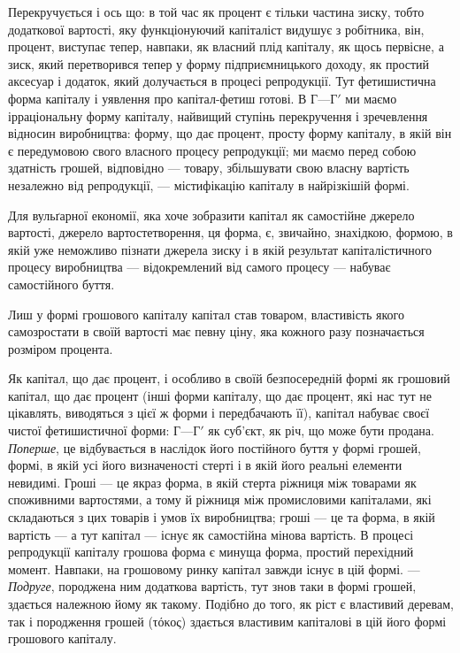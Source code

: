 Перекручується і ось що: в той час як процент є тільки
частина зиску, тобто додаткової вартості, яку функціонуючий
капіталіст видушує з робітника, він, процент, виступає тепер,
навпаки, як власний плід капіталу, як щось первісне, а зиск,
який перетворився тепер у форму підприємницького доходу,
як простий аксесуар і додаток, який долучається в процесі репродукції.
Тут фетишистична форма капіталу і уявлення про
капітал-фетиш готові. В $Г — Г'$ ми маємо ірраціональну форму
капіталу, найвищий ступінь перекручення і зречевлення відносин
виробництва: форму, що дає процент, просту форму капіталу,
в якій він є передумовою свого власного процесу репродукції;
ми маємо перед собою здатність грошей, відповідно —
товару, збільшувати свою власну вартість незалежно від репродукції,
— містифікацію капіталу в найрізкішій формі.

Для вульґарної економії, яка хоче зобразити капітал як самостійне
джерело вартості, джерело вартостетворення, ця форма,
є, звичайно, знахідкою, формою, в якій уже неможливо пізнати
джерела зиску і в якій результат капіталістичного процесу
виробництва — відокремлений від самого процесу — набуває самостійного
буття.

Лиш у формі грошового капіталу капітал став товаром,
властивість якого самозростати в своїй вартості має певну ціну,
яка кожного разу позначається розміром процента.

Як капітал, що дає процент, і особливо в своїй безпосередній
формі як грошовий капітал, що дає процент (інші форми капіталу,
що дає процент, які нас тут не цікавлять, виводяться
з цієї ж форми і передбачають її), капітал набуває своєї чистої
фетишистичної форми: $Г — Г'$ як суб’єкт, як річ, що може бути
продана. \emph{Поперше}, це відбувається в наслідок його постійного
буття у формі грошей, формі, в якій усі його визначеності стерті
і в якій його реальні елементи невидимі. Гроші — це якраз форма,
в якій стерта ріжниця між товарами як споживними вартостями,
а тому й ріжниця між промисловими капіталами, які складаються з
цих товарів і умов їх виробництва; гроші — це та форма, в якій
вартість — а тут капітал — існує як самостійна мінова вартість.
В процесі репродукції капіталу грошова форма є минуща форма,
простий перехідний момент. Навпаки, на грошовому ринку капітал
завжди існує в цій формі. — \emph{Подруге}, породжена ним додаткова
вартість, тут знов таки в формі грошей, здається належною
йому як такому. Подібно до того, як ріст є властивий
деревам, так і породження грошей (\textgreek{τόκος}) здається властивим
капіталові в цій його формі грошового капіталу.

